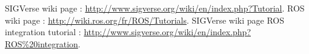 \documentclass[notitlepage]{report}
\begin{document}
\sloppy %


%

\tableofcontents %







 



\begin{thebibliography}{9}
          SIGVerse wiki page : 
          \url{http://www.sigverse.org/wiki/en/index.php?Tutorial}.
          ROS wiki page :
          \url{http://wiki.ros.org/fr/ROS/Tutorials}.
          SIGVerse wiki page ROS integration tutorial :
          \url{http://www.sigverse.org/wiki/en/index.php?ROS%20integration}.
     
\end{thebibliography}
\end{document}
